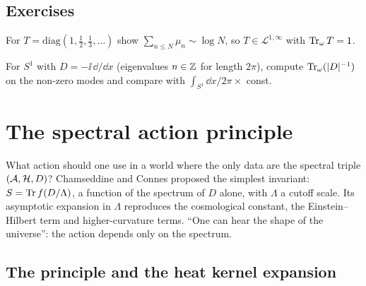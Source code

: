 \subsection*{Exercises}
\begin{exercise}\label{ex:dixmier:1}
For $T=\mathrm{diag}(1,\tfrac12,\tfrac13,\dots)$ show $\sum_{n\le N}\mu_n\sim\log N$, so $T\in\mathcal L^{1,\infty}$ with $\operatorname{Tr}_\omega T=1$.
\end{exercise}
\begin{exercise}\label{ex:dixmier:2}
For $S^1$ with $D=-\ii\,\dd/\dd x$ (eigenvalues $n\in\mathbb{Z}$ for length $2\pi$), compute $\operatorname{Tr}_\omega(|D|^{-1})$ on the non-zero modes and compare with $\int_{S^1}\dd x/2\pi\times$ const.
\end{exercise}

\section{The spectral action principle}\label{ch:spectral_action}
\skippable

\begin{physmotiv}
What action should one use in a world where the only data are the spectral triple $(\mathcal{A},\mathcal{H},D)$? Chamseddine and Connes \cite{CCM1997} proposed the simplest invariant: $S=\operatorname{Tr} f(D/\Lambda)$, a function of the spectrum of $D$ alone, with $\Lambda$ a cutoff scale. Its asymptotic expansion in $\Lambda$ reproduces the cosmological constant, the Einstein--Hilbert term and higher-curvature terms. ``One can hear the shape of the universe'': the action depends only on the spectrum.
\end{physmotiv}

\subsection{The principle and the heat kernel expansion}

